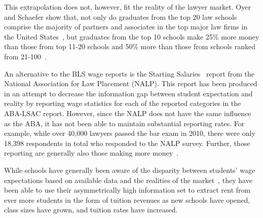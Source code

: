 \documentclass[12pt]{article}
\theoremstyle{definition}
\begin{document}
This extrapolation does not, however, fit the reality of the lawyer market. Oyer and Schaefer show that, not only do graduates from the top 20 law schools comprise the majority of partners and associates in the top major law firms in the United States~\cite{OyerSchaefer10}, but graduates from the top 10 schools make 25\% more money than those from top 11-20 schools and 50\% more than those from schools ranked from 21-100~\cite{OyerSchaefer09}.

An alternative to the BLS wage reports is the Starting Salaries~\cite{nalpSalaries} report from the National Association for Law Placement (NALP). This report has been produced in an attempt to decrease the information gap between student expectation and reality by reporting wage statistics for each of the reported categories in the ABA-LSAC report. However, since the NALP does not have the same influence as the ABA, it has not been able to maintain substantial reporting rates. For example, while over 40,000 lawyers passed the bar exam in 2010, there were only 18,398 respondents in total who responded to the NALP survey. Further, those reporting are generally also those making more money~\cite{Segal_econ}.

While schools have generally been aware of the disparity between students' wage expectations based on available data and the realities of the market~\cite{Segal_econ}, they have been able to use their asymmetrically high information set to extract rent from ever more students in the form of tuition revenues as new schools have opened, class sizes have grown, and tuition rates have increased.
\end{document}
